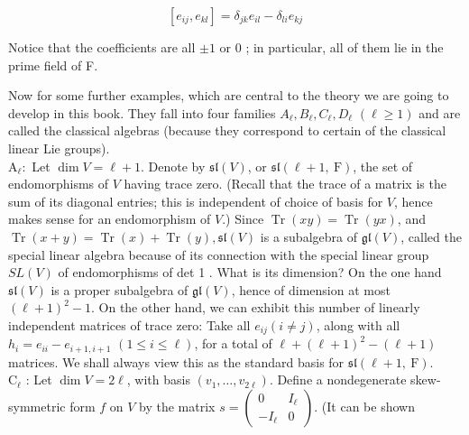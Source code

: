 \documentclass[10pt]{article}
\begin{document}
\begin{equation*}
\left[e_{i j}, e_{k l}\right]=\delta_{j k} e_{i l}-\delta_{l i} e_{k j} \tag{*}
\end{equation*}


Notice that the coefficients are all $\pm 1$ or 0 ; in particular, all of them lie in the prime field of F.

Now for some further examples, which are central to the theory we are going to develop in this book. They fall into four families $A_{\ell}, B_{\ell}, C_{\ell}, D_{\ell}$ $(\ell \geq 1)$ and are called the classical algebras (because they correspond to certain of the classical linear Lie groups).\\
$\mathrm{A}_{\ell}:$ Let $\operatorname{dim} V=\ell+1$. Denote by $\mathfrak{s l}(V)$, or $\mathfrak{s l}(\ell+1, \mathrm{~F})$, the set of endomorphisms of $V$ having trace zero. (Recall that the trace of a matrix is the sum of its diagonal entries; this is independent of choice of basis for $V$, hence makes sense for an endomorphism of $V$.) Since $\operatorname{Tr}(x y)=\operatorname{Tr}(y x)$, and $\operatorname{Tr}(x+y)=\operatorname{Tr}(x)+\operatorname{Tr}(y), \mathfrak{s l}(V)$ is a subalgebra of $\mathfrak{g l}(V)$, called the special linear algebra because of its connection with the special linear group $S L(V)$ of endomorphisms of det 1 . What is its dimension? On the one hand $\mathfrak{s l}(V)$ is a proper subalgebra of $\mathfrak{g l}(V)$, hence of dimension at most $(\ell+1)^{2}-1$. On the other hand, we can exhibit this number of linearly independent matrices of trace zero: Take all $e_{i j}(i \neq j)$, along with all $h_{i}=e_{i i}-e_{i+1, i+1}$ $(1 \leq i \leq \ell)$, for a total of $\ell+(\ell+1)^{2}-(\ell+1)$ matrices. We shall always view this as the standard basis for $\mathfrak{s l}(\ell+1, \mathrm{~F})$.\\
$\mathrm{C}_{\ell}$ : Let $\operatorname{dim} V=2 \ell$, with basis $\left(v_{1}, \ldots, v_{2 \ell}\right)$. Define a nondegenerate skew-symmetric form $f$ on $V$ by the matrix $s=\left(\begin{array}{rr}0 & I_{\ell} \\ -I_{\ell} & 0\end{array}\right)$. (It can be shown\\
\end{document}
